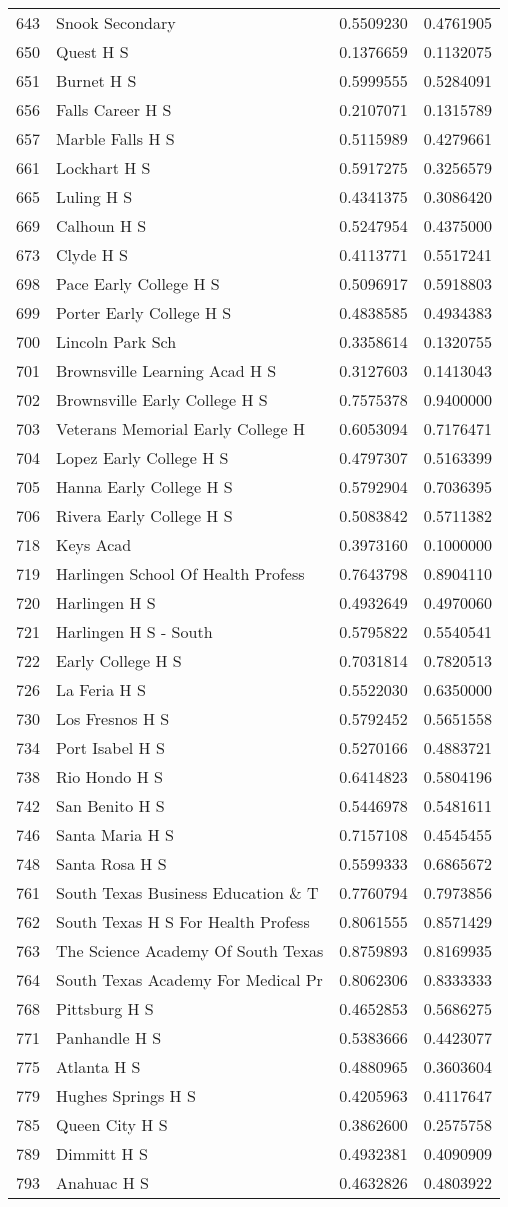\documentclass[
]{article}
\begin{document}
\begin{longtable}[]{@{}llrr@{}}
643 & Snook Secondary & 0.5509230 & 0.4761905\tabularnewline
650 & Quest H S & 0.1376659 & 0.1132075\tabularnewline
651 & Burnet H S & 0.5999555 & 0.5284091\tabularnewline
656 & Falls Career H S & 0.2107071 & 0.1315789\tabularnewline
657 & Marble Falls H S & 0.5115989 & 0.4279661\tabularnewline
661 & Lockhart H S & 0.5917275 & 0.3256579\tabularnewline
665 & Luling H S & 0.4341375 & 0.3086420\tabularnewline
669 & Calhoun H S & 0.5247954 & 0.4375000\tabularnewline
673 & Clyde H S & 0.4113771 & 0.5517241\tabularnewline
698 & Pace Early College H S & 0.5096917 & 0.5918803\tabularnewline
699 & Porter Early College H S & 0.4838585 & 0.4934383\tabularnewline
700 & Lincoln Park Sch & 0.3358614 & 0.1320755\tabularnewline
701 & Brownsville Learning Acad H S & 0.3127603 &
0.1413043\tabularnewline
702 & Brownsville Early College H S & 0.7575378 &
0.9400000\tabularnewline
703 & Veterans Memorial Early College H & 0.6053094 &
0.7176471\tabularnewline
704 & Lopez Early College H S & 0.4797307 & 0.5163399\tabularnewline
705 & Hanna Early College H S & 0.5792904 & 0.7036395\tabularnewline
706 & Rivera Early College H S & 0.5083842 & 0.5711382\tabularnewline
718 & Keys Acad & 0.3973160 & 0.1000000\tabularnewline
719 & Harlingen School Of Health Profess & 0.7643798 &
0.8904110\tabularnewline
720 & Harlingen H S & 0.4932649 & 0.4970060\tabularnewline
721 & Harlingen H S - South & 0.5795822 & 0.5540541\tabularnewline
722 & Early College H S & 0.7031814 & 0.7820513\tabularnewline
726 & La Feria H S & 0.5522030 & 0.6350000\tabularnewline
730 & Los Fresnos H S & 0.5792452 & 0.5651558\tabularnewline
734 & Port Isabel H S & 0.5270166 & 0.4883721\tabularnewline
738 & Rio Hondo H S & 0.6414823 & 0.5804196\tabularnewline
742 & San Benito H S & 0.5446978 & 0.5481611\tabularnewline
746 & Santa Maria H S & 0.7157108 & 0.4545455\tabularnewline
748 & Santa Rosa H S & 0.5599333 & 0.6865672\tabularnewline
761 & South Texas Business Education \& T & 0.7760794 &
0.7973856\tabularnewline
762 & South Texas H S For Health Profess & 0.8061555 &
0.8571429\tabularnewline
763 & The Science Academy Of South Texas & 0.8759893 &
0.8169935\tabularnewline
764 & South Texas Academy For Medical Pr & 0.8062306 &
0.8333333\tabularnewline
768 & Pittsburg H S & 0.4652853 & 0.5686275\tabularnewline
771 & Panhandle H S & 0.5383666 & 0.4423077\tabularnewline
775 & Atlanta H S & 0.4880965 & 0.3603604\tabularnewline
779 & Hughes Springs H S & 0.4205963 & 0.4117647\tabularnewline
785 & Queen City H S & 0.3862600 & 0.2575758\tabularnewline
789 & Dimmitt H S & 0.4932381 & 0.4090909\tabularnewline
793 & Anahuac H S & 0.4632826 & 0.4803922\tabularnewline

\end{longtable}
\end{document}
